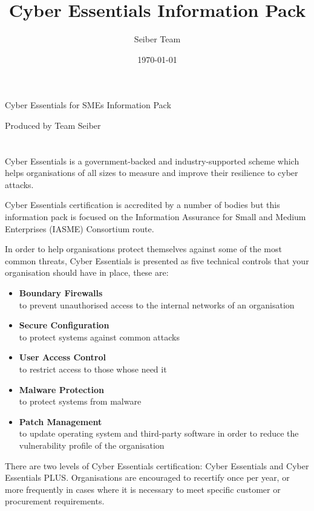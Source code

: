 \documentclass[12pt]{article}
\title{Cyber Essentials Information Pack}
\author{Seiber Team}
\date{\today}
\begin{document}

{\centering
  \LARGE Cyber Essentials for SMEs Information Pack\par
  \small Produced by Team Seiber\par
}

\section*{}
Cyber Essentials is a government-backed and industry-supported scheme which helps organisations of all sizes to measure and improve their resilience to cyber attacks.

Cyber Essentials certification is accredited by a number of bodies but this information pack is focused on the Information Assurance for Small and Medium Enterprises (IASME) Consortium route.

In order to help organisations protect themselves against some of the most common threats, Cyber Essentials is presented as five technical controls that your organisation should have in place, these are:
\begin{itemize}
  \item \textbf{Boundary Firewalls} \\to prevent unauthorised access to the internal networks of an organisation
  \item \textbf{Secure Configuration} \\to protect systems against common attacks
  \item \textbf{User Access Control} \\to restrict access to those whose need it
  \item \textbf{Malware Protection} \\to protect systems from malware
  \item \textbf{Patch Management} \\to update operating system and third-party software in order to reduce the vulnerability profile of the organisation
\end{itemize}

There are two levels of Cyber Essentials certification: Cyber Essentials and Cyber Essentials PLUS. Organisations are encouraged to recertify once per year, or more frequently in cases where it is necessary to meet specific customer or procurement requirements.
\end{document}
